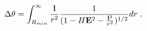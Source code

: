 \begin{equation}
\Delta \theta= \int_{R_{min}}^{\infty} \frac{{\bf 
l}}{r^2}\frac{1}{(1-H{\bf E}^2 
-\frac{{\bf 
l}^2}{r^2})^{1/2}}dr\ .
\end{equation}

